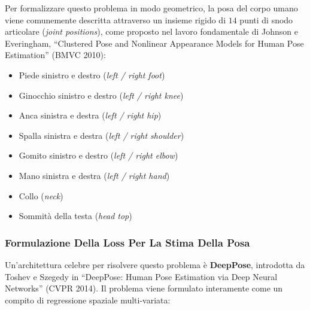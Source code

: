 ﻿\documentclass[11pt, a4paper]{article}
\begin{document}
Per formalizzare questo problema in modo geometrico, la posa del corpo umano viene comunemente descritta attraverso un insieme rigido di $14$ punti di snodo articolare (\emph{joint positions}), come proposto nel lavoro fondamentale di Johnson e Everingham, ``Clustered Pose and Nonlinear Appearance Models for Human Pose Estimation'' (BMVC 2010):
\begin{itemize}[noitemsep]
    \item Piede sinistro e destro (\emph{left / right foot})
    \item Ginocchio sinistro e destro (\emph{left / right knee})
    \item Anca sinistra e destra (\emph{left / right hip})
    \item Spalla sinistra e destra (\emph{left / right shoulder})
    \item Gomito sinistro e destro (\emph{left / right elbow})
    \item Mano sinistra e destra (\emph{left / right hand})
    \item Collo (\emph{neck})
    \item Sommità della testa (\emph{head top})
\end{itemize}

\newpage

\subsubsection{Formulazione Della Loss Per La Stima Della Posa}

Un'architettura celebre per risolvere questo problema è \textbf{DeepPose}, introdotta da Toshev e Szegedy in ``DeepPose: Human Pose Estimation via Deep Neural Networks'' (CVPR 2014). Il problema viene formulato interamente come un compito di regressione spaziale multi-variata:

\end{document}
